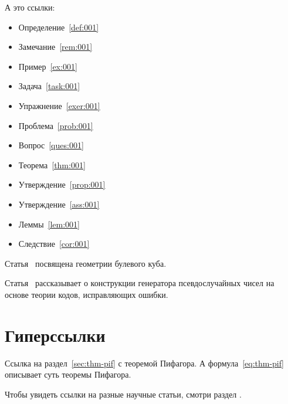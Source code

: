 \documentclass[colorthm]{../civarticle}
\begin{document}
\begin{assertion*}
  \Blindtext[2]
\end{assertion*}

\begin{corollary}
  \label{cor:001}
  \Blindtext[2]
\end{corollary}

\begin{corollary*}
  \Blindtext[2]
\end{corollary*}

\begin{lemma}
  \label{lem:001}
  \Blindtext[2]
\end{lemma}

\begin{lemma*}
  \Blindtext[2]
\end{lemma*}

А это ссылки:

\begin{itemize}
\item Определение~\ref{def:001}
\item Замечание~\ref{rem:001}
\item Пример~\ref{ex:001}
\item Задача~\ref{task:001}
\item Упражнение~\ref{exer:001}
\item Проблема~\ref{prob:001}
\item Вопрос~\ref{ques:001}
\item Теорема~\ref{thm:001}
\item Утверждение~\ref{prop:001}
\item Утверждение~\ref{ass:001}
\item Леммы~\ref{lem:001}
\item Следствие~\ref{cor:001}
\end{itemize}

Статья~\cite{ahlswede1977} посвящена геометрии булевого куба.

Статья~\cite{ahmed2013} рассказывает о конструкции генератора
псевдослучайных чисел на основе теории кодов, исправляющих ошибки.


\section{Гиперссылки}
\label{sec:hyper}

Ссылка на раздел~\ref{sec:thm-pif} с теоремой Пифагора.  А
формула~\eqref{eq:thm-pif} описывает суть теоремы Пифагора.

Чтобы увидеть ссылки на разные научные статьи, смотри раздел
\hyperref[sec:ref-to-articles]{}.
\end{document}
